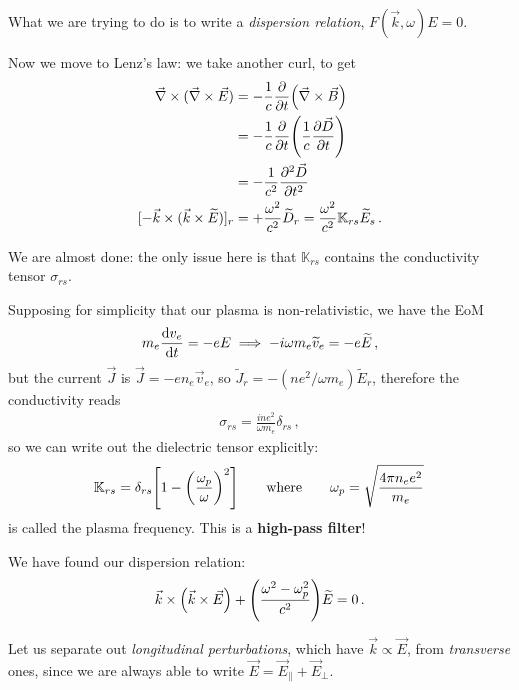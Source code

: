 \documentclass[main.tex]{subfiles}
\begin{document}
What we are trying to do is to write a \emph{dispersion relation}, \(F(\vec{k}, \omega ) E = 0\). 

Now we move to Lenz's law: we take another curl, to get 
%
\begin{subequations}
\begin{align}
\vec{\nabla} \times (\vec{\nabla} \times \vec{E}) &= - \frac{1}{c} \pdv{}{t} \qty(\vec{\nabla} \times \vec{B})   \\
&= - \frac{1}{c} \pdv{}{t} \qty( \frac{1}{c}\pdv{\vec{D}}{t})  \\
&= - \frac{1}{c^2} \pdv[2]{\vec{D}}{t}  \\
[- \vec{k} \times (\vec{k} \times \widetilde{E})]_r &= + \frac{\omega^2}{c^2} \widetilde{D}_r = \frac{\omega^2}{c^2} \mathbb{K}_{rs} \widetilde{E}_s
\,.
\end{align}
\end{subequations}

We are almost done: the only issue here is that \(\mathbb{K}_{rs}\) contains the conductivity tensor \(\sigma_{rs}\). 

Supposing for simplicity  that our plasma is non-relativistic, we have the EoM 
%
\begin{align}
m_e \dv{v_e}{t} = - e E \implies 
- i \omega m_e \widetilde{v}_e = - e \widetilde{E}
\,,
\end{align}
%
but the current \(\vec{J}\) is \(\vec{J} = - e n_e \vec{v}_e\), so \(\widetilde{J}_r = - (n e^2 / \omega m_e) \widetilde{E}_r\), therefore the conductivity reads 
%
\begin{align}
\sigma_{rs} = \frac{i n e^2}{\omega m_e} \delta_{rs} 
\,,
\end{align}
%
so we can write out the dielectric tensor explicitly: 
%
\begin{align}
\mathbb{K}_{rs} = \delta_{rs} \qty[ 1 - \qty(\frac{\omega_p}{\omega })^2]
\qquad \text{where} \qquad
\omega_p = \sqrt{\frac{ 4 \pi n_e e^2}{m_e}}
\,
\end{align}
%
is called the plasma frequency.
This is a \textbf{high-pass filter}!

We have found our dispersion relation: 
%
\begin{align}
\vec{k} \times \qty(\vec{k} \times \vec{E})
+ \qty(\frac{\omega^2 - \omega _p^2}{c^2}) \widetilde{E} = 0
\,.
\end{align}

Let us separate out \emph{longitudinal perturbations}, which have \(\vec{k} \propto \vec{E}\), from \emph{transverse} ones, since we are always able to write \(\vec{E} = \vec{E}_\parallel + \vec{E}_\perp\). 
\end{document}
